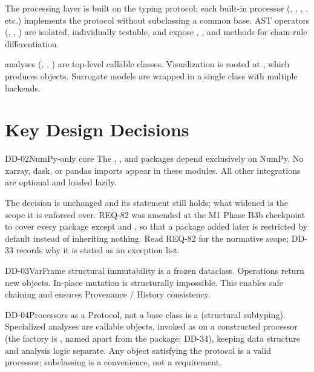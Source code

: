 The processing layer is built on the  typing protocol; each
built-in processor (, , ,
, etc.) implements the protocol without subclassing a
common base. AST operators (, , ) are
isolated, individually testable, and expose , ,
and  methods for chain-rule differentiation.

 analyses (,
, ) are top-level callable
classes. Visualization is rooted at , which produces
 objects. Surrogate models are wrapped in a single
 class with multiple backends.

\section{Key Design Decisions}

\begin{ddbox}{DD-02}{NumPy-only core}
The , , and  packages depend
exclusively on NumPy. No xarray, dask, or pandas imports appear in these
modules. All other integrations are optional and loaded lazily.

The decision is unchanged and its statement still holds; what widened
is the scope it is enforced over. REQ-82 was amended at the M1 Phase
B3b checkpoint to cover every package except  and
, so that a package added later is restricted by default
instead of inheriting nothing. Read REQ-82 for the normative scope;
DD-33 records why it is stated as an exception list.
\end{ddbox}

\begin{ddbox}{DD-03}{VarFrame structural immutability}
 is a frozen dataclass. Operations return new objects.
In-place mutation is structurally impossible. This enables safe chaining
and ensures Provenance / History consistency.
\end{ddbox}

\begin{ddbox}{DD-04}{Processors as a Protocol, not a base class}
 is a  (structural subtyping).
Specialized analyses are callable objects, invoked as 
on a constructed processor (the factory is , named
apart from the  package; DD-34),
keeping data structure and analysis logic separate. Any object satisfying
the protocol is a valid processor; subclassing  is a
convenience, not a requirement.
\end{ddbox}


